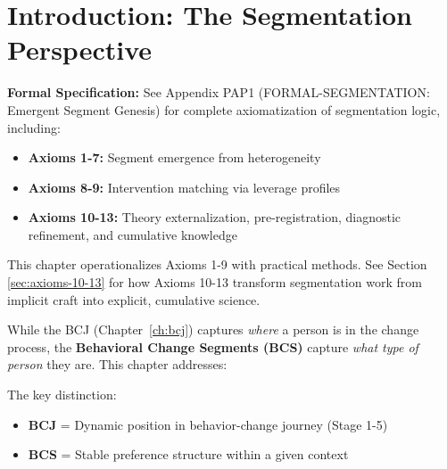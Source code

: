 \section{Introduction: The Segmentation Perspective}

\begin{tcolorbox}[colback=blue!5!white, colframe=blue!75!black,
    title=Supporting Appendix]

\textbf{Formal Specification:} See Appendix PAP1 (FORMAL-SEGMENTATION: Emergent Segment Genesis) for complete axiomatization of segmentation logic, including:
\begin{itemize}[nosep]
\item \textbf{Axioms 1-7:} Segment emergence from heterogeneity
\item \textbf{Axioms 8-9:} Intervention matching via leverage profiles
\item \textbf{Axioms 10-13:} Theory externalization, pre-registration, diagnostic refinement, and cumulative knowledge
\end{itemize}

This chapter operationalizes Axioms 1-9 with practical methods. See Section \ref{sec:axioms-10-13} for how Axioms 10-13 transform segmentation work from implicit craft into explicit, cumulative science.

\end{tcolorbox}

\vspace{1em}

While the BCJ (Chapter~\ref{ch:bcj}) captures \emph{where} a person is in the
change process, the \textbf{Behavioral Change Segments (BCS)} capture
\emph{what type of person} they are. This chapter addresses:

\begin{center}
\end{center}

The key distinction:
\begin{itemize}
    \item \textbf{BCJ} = Dynamic position in behavior-change journey (Stage 1-5)
    \item \textbf{BCS} = Stable preference structure within a given context
\end{itemize}

